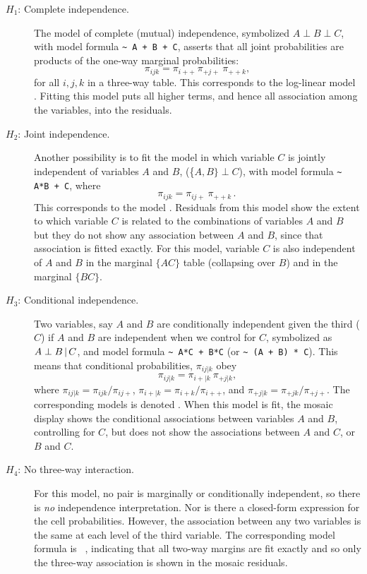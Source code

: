 \documentclass[10pt,krantz2]{krantz}\usepackage[]{graphicx}\usepackage[]{color}
\begin{document}
\begin{description}
\item[$H_1$: Complete independence.]  The model of complete (mutual) independence, symbolized $A \perp B \perp C$, with model formula \verb|~ A + B + C|,
       asserts that all joint probabilities are products of the
       one-way marginal probabilities:
\begin{equation*}
 \pi_{ijk} = \pi_{i++} \: \pi_{+j+} \: \pi_{++k}
 \comma
\end{equation*}
for all \(i , j , k\) in a
       three-way table.  This corresponds to the log-linear model
       .  Fitting this model puts all higher
       terms, and hence all association among the variables, into the
       residuals.

\item[$H_2$: Joint independence.]  Another possibility is to fit the model in
       which variable \(C\) is jointly independent of variables \(A\)
       and \(B\), (\{$A , B \} \perp C $), with model formula \verb|~ A*B + C|,
       where
\begin{equation*}
 \pi_{ijk}  =  \pi_{ij+} \:  \pi_{++k} \period
\end{equation*}
This corresponds to the \loglin model .
Residuals from this model show the extent to which
variable \(C\) is related to the combinations of variables
\(A\) and \(B\) but they do not show any association between
\(A\) and \(B\), since that association is fitted exactly.
For this model, variable $C$ is also independent of $A$ and
$B$ in the marginal $\{AC\}$ table (collapsing over $B$) and
in the marginal $\{BC\}$.

\item[$H_3$: Conditional independence.] Two variables, say $A$ and $B$ are conditionally independent
given the third ($C$) if $A$ and $B$ are independent when we
control for $C$, symbolized as $A \perp B \, | \, C$, and model formula 
\verb|~ A*C + B*C| (or \verb|~ (A + B) * C|).
This means that conditional probabilities, $\pi_{ij|k}$ obey
\begin{equation*}
 \pi_{ij|k}  =  \pi_{i+|k} \:  \pi_{+j|k} \comma
\end{equation*}
where
$\pi_{ij|k} = \pi_{ijk} / \pi_{ij+}$,
$\pi_{i+|k} = \pi_{i+k} / \pi_{i++}$, and
$\pi_{+j|k} = \pi_{+jk} / \pi_{+j+}$.
The corresponding \loglin{} models is denoted .
When this model is fit, the mosaic display shows the conditional
associations between variables $A$ and $B$, controlling for $C$,
but does not show the associations between $A$ and $C$, or
$B$ and $C$.

\item[$H_4$: No three-way interaction.]  For this model, no pair is
marginally or
conditionally independent, so there is \emph{no} independence interpretation.
Nor is there a closed-form expression for the cell probabilities.
However, the association between any two
variables is the same at each level of the third variable.
The corresponding \loglin model formula is ~,
indicating that all two-way margins are fit exactly and so
only the three-way association is
shown in the mosaic residuals.
\end{description}
\end{document}
